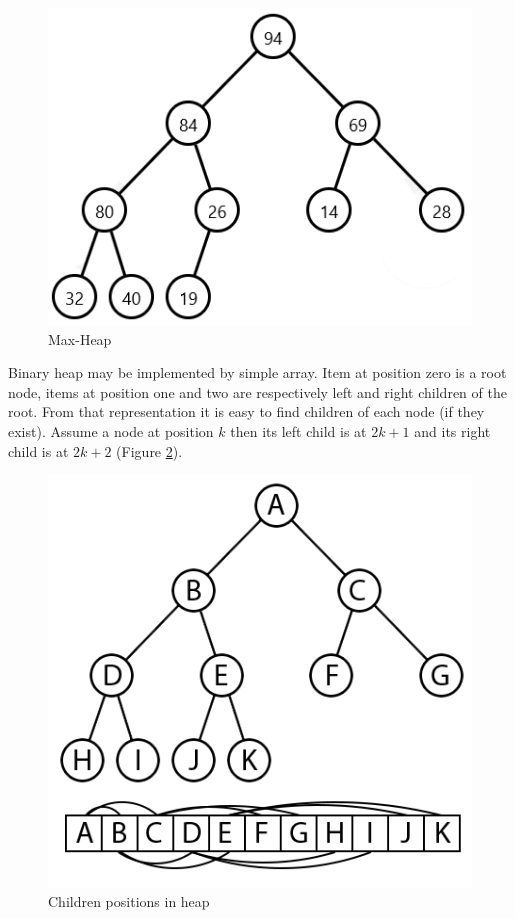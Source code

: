 \documentclass[
  field=inf,
  biblatex,
  language=english,
  glossaries,
  theorems=false,
  sourcecodes=false,
  index
]{kidiplom}
\begin{document}
\begin{figure}[H]
\begin{center}
	
	\includegraphics[scale=0.7]{img/Maxheap.png}
	\caption{Max-Heap}\label{fig:maxheap}
\end{center}
\end{figure}

Binary heap may be implemented by simple array. Item at position zero is a root node, items at position one and two are respectively left and right children of the root. From that representation it is easy to find children of each node (if they exist). Assume a node at position $k$ then its left child is at $2k + 1$ and its right child is at $2k + 2$ (Figure \ref{fig:heapsort}).

\begin{figure}[H]
\begin{center}
	
	\includegraphics[scale=0.5]{img/Heapsort.png}
	\caption{Children positions in heap}\label{fig:heapsort}
\end{center}
\end{figure}
\end{document}
